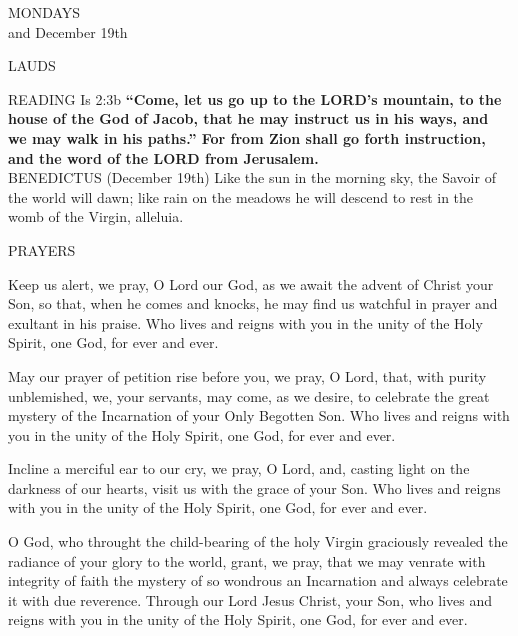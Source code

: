 \begin{center}\normalsize{\uppercase{Mondays\\}}
\footnotesize{and December 19th}\end{center}
\begin{flushleft}\normalsize{\uppercase{Lauds\\}}\end{flushleft}
\noindent\small{\uppercase{Reading}} Is 2:3b \textbf{“Come, let us go up to the LORD’s mountain, to the house of the God of Jacob, that he may instruct us in his ways, and we may walk in his paths.” For from Zion shall go forth instruction, and the word of the LORD from Jerusalem.\\}
\noindent\small{\uppercase{Benedictus}} (December 19th)
Like the sun in the morning sky, the Savoir of the world will dawn; like rain on the meadows he will descend to rest in the womb of the Virgin, alleluia.

\noindent\small{\uppercase{Prayers}}\begin{description}[labelindent=\parindent, leftmargin=*]
\item [Week 1] Keep us alert, we pray, O Lord our God, as we await the advent of Christ your Son, so that, when he comes and knocks, he may find us watchful in prayer and exultant in his praise. Who lives and reigns with you in the unity of the Holy Spirit, one God, for ever and ever.
\item [Week 2] May our prayer of petition rise before you, we pray, O Lord, that, with purity unblemished, we, your servants, may come, as we desire, to celebrate the great mystery of the Incarnation of your Only Begotten Son. Who lives and reigns with you in the unity of the Holy Spirit, one God, for ever and ever.
\item [Week 3] Incline a merciful ear to our cry, we pray, O Lord, and, casting light on the darkness of our hearts, visit us with the grace of your Son. Who lives and reigns with you in the unity of the Holy Spirit, one God, for ever and ever.
\item [December 19th] O God, who throught the child-bearing of the holy Virgin graciously revealed the radiance of your glory to the world, grant, we pray, that we may venrate with integrity of faith the mystery of so wondrous an Incarnation and always celebrate it with due reverence. Through our Lord Jesus Christ, your Son, who lives and reigns with you in the unity of the Holy Spirit, one God, for ever and ever.
\end{description}


